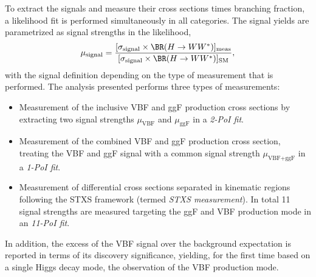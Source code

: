 To extract the signals and measure their cross sections times \HWW branching fraction, a likelihood fit is performed simultaneously in all categories. 
The signal yields are parametrized as signal strengths in the likelihood, 
\begin{equation}
    \label{eq:incl-ggF-VBF-signal-strengths}
    \mu_{\text{signal}} = \frac{ [ \sigma_{\text{signal}}  \times \BR(H \to WW^*) ]_\text{meas} } { [ \sigma_{\text{signal}} \times \BR(H \to WW^*) ]_\text{SM}}, 
\end{equation}
with the signal definition depending on the type of measurement that is performed.
The analysis presented performs three types of measurements:
\begin{itemize}
    \item Measurement of the inclusive VBF and ggF production cross sections by extracting two signal strengths $\mu_{\text{VBF}}$ and $\mu_{\text{ggF}}$ in a \emph{2-PoI fit}.
    \item Measurement of the combined VBF and ggF production cross section, treating the VBF and ggF signal with a common signal strength $\mu_{\text{VBF+ggF}}$ in a \emph{1-PoI fit}.
    \item Measurement of differential cross sections separated in kinematic regions following the STXS framework (termed \emph{STXS measurement}). In total 11 signal strengths are measured targeting the ggF and VBF production mode in an \emph{11-PoI fit}. 
\end{itemize}
In addition, the excess of the VBF signal over the background expectation is reported in terms of its discovery significance, yielding, for the first time based on a single Higgs decay mode, the observation of the VBF production mode.


